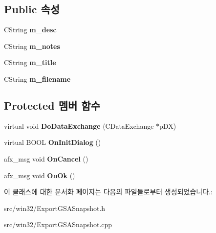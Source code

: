 \subsection*{Public 속성}
\begin{DoxyCompactItemize}
\item 
\mbox{\label{class_export_g_s_a_snapshot_afbd1310c7508cf3620cdc29dcb5871cc}} 
C\+String {\bfseries m\+\_\+desc}
\item 
\mbox{\label{class_export_g_s_a_snapshot_ac070b8dc915716aad113bae269ce6e97}} 
C\+String {\bfseries m\+\_\+notes}
\item 
\mbox{\label{class_export_g_s_a_snapshot_a8e7e31444aaab44e9216958e17fceb5d}} 
C\+String {\bfseries m\+\_\+title}
\item 
\mbox{\label{class_export_g_s_a_snapshot_a517746214715c32e5a153b44a80bf79e}} 
C\+String {\bfseries m\+\_\+filename}
\end{DoxyCompactItemize}
\subsection*{Protected 멤버 함수}
\begin{DoxyCompactItemize}
\item 
\mbox{\label{class_export_g_s_a_snapshot_a892a749aacc888d1408cb8fb85c950c9}} 
virtual void {\bfseries Do\+Data\+Exchange} (C\+Data\+Exchange $\ast$p\+DX)
\item 
\mbox{\label{class_export_g_s_a_snapshot_a1fb347339492a091f3a550767b16ed06}} 
virtual B\+O\+OL {\bfseries On\+Init\+Dialog} ()
\item 
\mbox{\label{class_export_g_s_a_snapshot_a233d4db37eebfb2286379e5ffe757667}} 
afx\+\_\+msg void {\bfseries On\+Cancel} ()
\item 
\mbox{\label{class_export_g_s_a_snapshot_ae057bb5c974df748b1adedfc5bcdca58}} 
afx\+\_\+msg void {\bfseries On\+Ok} ()
\end{DoxyCompactItemize}


이 클래스에 대한 문서화 페이지는 다음의 파일들로부터 생성되었습니다.\+:\begin{DoxyCompactItemize}
\item 
src/win32/Export\+G\+S\+A\+Snapshot.\+h\item 
src/win32/Export\+G\+S\+A\+Snapshot.\+cpp\end{DoxyCompactItemize}
